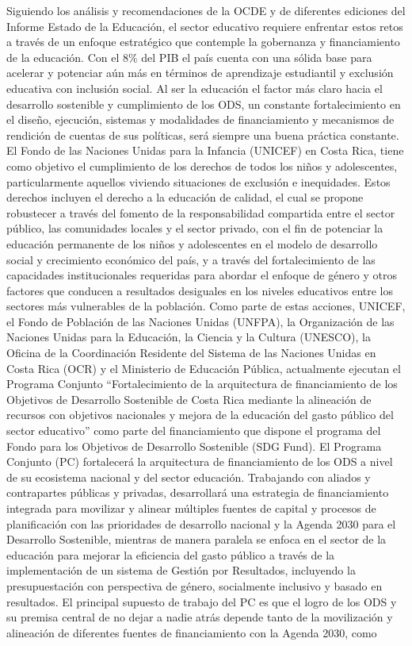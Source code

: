 \documentclass[a4paper, 9pt, conference]{article}              %
\theoremstyle{definition}
\begin{document}
Siguiendo los an\'alisis y recomendaciones de la OCDE y de diferentes ediciones del Informe Estado de la Educaci\'on, el sector educativo requiere enfrentar estos retos a trav\'es de un enfoque estrat\'egico que contemple la gobernanza y financiamiento de la educaci\'on. Con el 8\% del PIB el pa\'is cuenta con una s\'olida base para acelerar y potenciar a\'un m\'as en t\'erminos de aprendizaje estudiantil y exclusi\'on educativa con inclusi\'on social. Al ser la educaci\'on el factor m\'as claro hacia el desarrollo sostenible y cumplimiento de los ODS, un constante fortalecimiento en el dise\~no, ejecuci\'on, sistemas y modalidades de financiamiento y mecanismos de rendici\'on de cuentas de sus pol\'iticas, ser\'a siempre una buena pr\'actica constante. El Fondo de las Naciones Unidas para la Infancia (UNICEF) en Costa Rica, tiene como objetivo el cumplimiento de los derechos de todos los ni\~nos y adolescentes, particularmente aquellos viviendo situaciones de exclusi\'on e inequidades. Estos derechos incluyen el derecho a la educaci\'on de calidad, el cual se propone robustecer a trav\'es del fomento de la responsabilidad compartida entre el sector p\'ublico, las comunidades locales y el sector privado, con el fin de potenciar la educaci\'on permanente de los ni\~nos y adolescentes en el modelo de desarrollo social y crecimiento econ\'omico del pa\'is, y a trav\'es del fortalecimiento de las capacidades institucionales requeridas para abordar el enfoque de g\'enero y otros factores que conducen a resultados desiguales en los niveles educativos entre los sectores m\'as vulnerables de la poblaci\'on. Como parte de estas acciones, UNICEF, el Fondo de Poblaci\'on de las Naciones Unidas (UNFPA), la Organizaci\'on de las Naciones Unidas para la Educaci\'on, la Ciencia y la Cultura (UNESCO), la Oficina de la Coordinaci\'on Residente del Sistema de las Naciones Unidas en Costa Rica (OCR) y el Ministerio de Educaci\'on P\'ublica, actualmente ejecutan el Programa Conjunto ``Fortalecimiento de la arquitectura de financiamiento de los Objetivos de Desarrollo Sostenible de Costa Rica mediante la alineaci\'on de recursos con objetivos nacionales y mejora de la educaci\'on del gasto p\'ublico del sector educativo'' como parte del financiamiento que dispone el programa del Fondo para los Objetivos de Desarrollo Sostenible (SDG Fund). El Programa Conjunto (PC) fortalecer\'a la arquitectura de financiamiento de los ODS a nivel de su ecosistema nacional y del sector educaci\'on. Trabajando con aliados y contrapartes p\'ublicas y privadas, desarrollar\'a una estrategia de financiamiento integrada para movilizar y alinear m\'ultiples fuentes de capital y procesos de planificaci\'on con las prioridades de desarrollo nacional y la Agenda 2030 para el Desarrollo Sostenible, mientras de manera paralela se enfoca en el sector de la educaci\'on para mejorar la eficiencia del gasto p\'ublico a trav\'es de la implementaci\'on de un sistema de Gesti\'on por Resultados, incluyendo la presupuestaci\'on con perspectiva de g\'enero, socialmente inclusivo y basado en resultados. El principal supuesto de trabajo del PC es que el logro de los ODS y su premisa central de no dejar a nadie atr\'as depende tanto de la movilizaci\'on y alineaci\'on de diferentes fuentes de financiamiento con la Agenda 2030, como 
\end{document}
